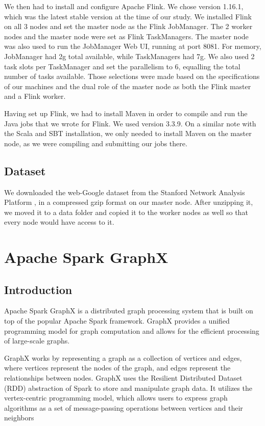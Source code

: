 \documentclass[conference]{IEEEtran}
\begin{document}
We then had to install and configure Apache Flink. We chose version 1.16.1, which was the latest stable version at the time of our study. We installed Flink on all 3 nodes and set the master node as the Flink JobManager. The 2 worker nodes and the master node were set as Flink TaskManagers. The master node was also used to run the JobManager Web UI, running at port 8081. For memory, JobManager had 2g total available, while TaskManagers had 7g. We also used 2 task slots per TaskManager and set the parallelism to 6, equalling the total number of tasks available. Those selections were made based on the specifications of our machines and the dual role of the master node as both the Flink master and a Flink worker.

Having set up Flink, we had to install Maven \cite{b12} in order to compile and run the Java jobs that we wrote for Flink. We used version 3.3.9. On a similar note with the Scala and SBT installation, we only needed to install Maven on the master node, as we were compiling and submitting our jobs there.

\subsection{Dataset}

We downloaded the web-Google dataset from the Stanford Network Analysis Platform \cite{b5}, in a compressed gzip format on our master node. After unzipping it, we moved it to a data folder and copied it to the worker nodes as well so that every node would have access to it.

\section{\textbf{Apache Spark GraphX}}\label{graphx}

\subsection{Introduction}

Apache Spark GraphX \cite{b1} is a distributed graph processing system that is built on top of the popular Apache Spark framework. GraphX provides a unified programming model for graph computation and allows for the efficient processing of large-scale graphs.

GraphX works by representing a graph as a collection of vertices and edges, where vertices represent the nodes of the graph, and edges represent the relationships between nodes. GraphX uses the Resilient Distributed Dataset (RDD) abstraction of Spark to store and manipulate graph data. It utilizes the vertex-centric programming model, which allows users to express graph algorithms as a set of message-passing operations between vertices and their neighbors
\end{document}

